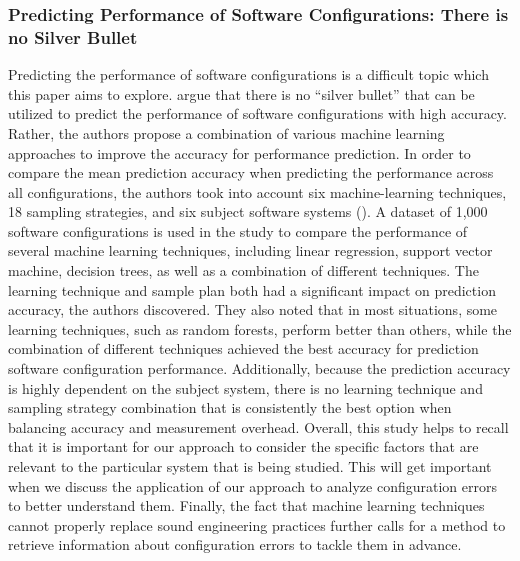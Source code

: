 \documentclass[english,bachelor]{swsLeipzig}
\begin{document}
\subsubsection{Predicting Performance of Software Configurations: There is no Silver Bullet}
Predicting the performance of software configurations is a difficult topic which this paper aims to explore. \citet{grebhahn:2019} argue that there is no ``silver bullet'' that can be utilized to predict the performance of software configurations with high accuracy. Rather, the authors propose a combination of various machine learning approaches to improve the accuracy for performance prediction. In order to compare the mean prediction accuracy when predicting the performance across all configurations, the authors took into account six machine-learning techniques, 18 sampling strategies, and six subject software systems (\citet{grebhahn:2019}). A dataset of 1,000 software configurations is used in the study to compare the performance of several machine learning techniques, including linear regression, support vector machine, decision trees, as well as a combination of different techniques. The learning technique and sample plan both had a significant impact on prediction accuracy, the authors discovered. They also noted that in most situations, some learning techniques, such as random forests, perform better than others, while the combination of different techniques achieved the best accuracy for prediction software configuration performance. Additionally, because the prediction accuracy is highly dependent on the subject system, there is no learning technique and sampling strategy combination that is consistently the best option when balancing accuracy and measurement overhead. Overall, this study helps to recall that it is important for our approach to consider the specific factors that are relevant to the particular system that is being studied. This will get important when we discuss the application of our approach to analyze configuration errors to better understand them. Finally, the fact that machine learning techniques cannot properly replace sound engineering practices further calls for a method to retrieve information about configuration errors to tackle them in advance.
\end{document}
